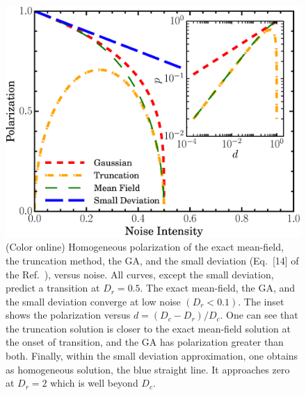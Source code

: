 \documentclass[reprint,floatfix,amsmath,amssymb,aps,pre,showkeys,showpacs,superscriptaddress]{revtex4-1}
\begin{document}
\begin{figure}
	\centering
	\includegraphics[width=\columnwidth]{Fig3_p-noise-homogeneous}
	\caption{(Color online) Homogeneous polarization of the exact mean-field, the truncation method, the GA, and the small deviation (Eq.~[14] of the Ref.~\cite{allaei2016}), versus noise. All curves, except the small deviation, predict a transition at $D_r=0.5$. The exact mean-field, the GA, and the small deviation converge at low noise $(D_r < 0.1)$. The inset shows the polarization versus $d=(D_c - D_r) / D_c$. One can see that the truncation solution is closer to the exact mean-field solution at the onset of transition, and the GA has polarization greater than both. Finally, within the small deviation approximation, one obtains as homogeneous solution, the blue straight line. It approaches zero at $D_r=2$ which is well beyond $D_c$.}
	\label{fig:mean-field}
\end{figure}
\end{document}
